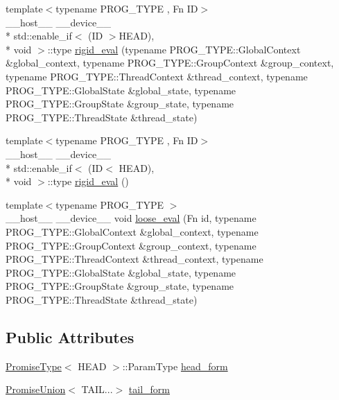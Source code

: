 \begin{DoxyCompactItemize}
\item 
{\footnotesize template$<$typename P\-R\-O\-G\-\_\-\-T\-Y\-P\-E , Fn I\-D$>$ }\\\-\_\-\-\_\-host\-\_\-\-\_\- \-\_\-\-\_\-device\-\_\-\-\_\- \\*
std\-::enable\-\_\-if$<$ (I\-D $>$H\-E\-A\-D), \\*
void $>$\-::type \hyperlink{unionPromiseUnion_3_01HEAD_00_01TAIL_8_8_8_4_a1b189e55ba0146e43798c1003467430d}{rigid\-\_\-eval} (typename P\-R\-O\-G\-\_\-\-T\-Y\-P\-E\-::\-Global\-Context \&global\-\_\-context, typename P\-R\-O\-G\-\_\-\-T\-Y\-P\-E\-::\-Group\-Context \&group\-\_\-context, typename P\-R\-O\-G\-\_\-\-T\-Y\-P\-E\-::\-Thread\-Context \&thread\-\_\-context, typename P\-R\-O\-G\-\_\-\-T\-Y\-P\-E\-::\-Global\-State \&global\-\_\-state, typename P\-R\-O\-G\-\_\-\-T\-Y\-P\-E\-::\-Group\-State \&group\-\_\-state, typename P\-R\-O\-G\-\_\-\-T\-Y\-P\-E\-::\-Thread\-State \&thread\-\_\-state)
\item 
{\footnotesize template$<$typename P\-R\-O\-G\-\_\-\-T\-Y\-P\-E , Fn I\-D$>$ }\\\-\_\-\-\_\-host\-\_\-\-\_\- \-\_\-\-\_\-device\-\_\-\-\_\- \\*
std\-::enable\-\_\-if$<$ (I\-D$<$ H\-E\-A\-D), \\*
void $>$\-::type \hyperlink{unionPromiseUnion_3_01HEAD_00_01TAIL_8_8_8_4_af60e0a5350bceaf62bb93074064dbada}{rigid\-\_\-eval} ()
\item 
{\footnotesize template$<$typename P\-R\-O\-G\-\_\-\-T\-Y\-P\-E $>$ }\\\-\_\-\-\_\-host\-\_\-\-\_\- \-\_\-\-\_\-device\-\_\-\-\_\- void \hyperlink{unionPromiseUnion_3_01HEAD_00_01TAIL_8_8_8_4_a8df643d5323314d950d3a0955b19f44e}{loose\-\_\-eval} (Fn id, typename P\-R\-O\-G\-\_\-\-T\-Y\-P\-E\-::\-Global\-Context \&global\-\_\-context, typename P\-R\-O\-G\-\_\-\-T\-Y\-P\-E\-::\-Group\-Context \&group\-\_\-context, typename P\-R\-O\-G\-\_\-\-T\-Y\-P\-E\-::\-Thread\-Context \&thread\-\_\-context, typename P\-R\-O\-G\-\_\-\-T\-Y\-P\-E\-::\-Global\-State \&global\-\_\-state, typename P\-R\-O\-G\-\_\-\-T\-Y\-P\-E\-::\-Group\-State \&group\-\_\-state, typename P\-R\-O\-G\-\_\-\-T\-Y\-P\-E\-::\-Thread\-State \&thread\-\_\-state)
\end{DoxyCompactItemize}
\subsection*{Public Attributes}
\begin{DoxyCompactItemize}
\item 
\hyperlink{structPromiseType}{Promise\-Type}$<$ H\-E\-A\-D $>$\-::Param\-Type \hyperlink{unionPromiseUnion_3_01HEAD_00_01TAIL_8_8_8_4_ad16aa739f66e08aae6b96fb088a8bcce}{head\-\_\-form}
\item 
\hyperlink{unionPromiseUnion}{Promise\-Union}$<$ T\-A\-I\-L...$>$ \hyperlink{unionPromiseUnion_3_01HEAD_00_01TAIL_8_8_8_4_aa60a2e4583b3dd00b35cee4786b2858c}{tail\-\_\-form}
\end{DoxyCompactItemize}


